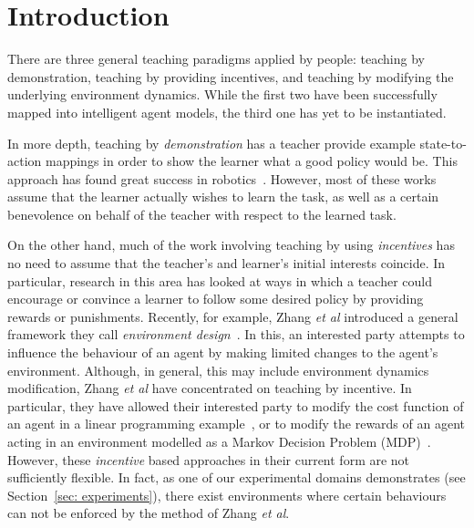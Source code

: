 \section{Introduction}
\noindent There are three general teaching paradigms applied by people:
teaching by demonstration, teaching by providing incentives, and
teaching by modifying the underlying environment dynamics.  While the
first two have been successfully mapped into intelligent agent models,
the third one has yet to be
instantiated.

In more depth, teaching by {\em demonstration} has a teacher provide example
state-to-action mappings in order to show the learner what a good
policy would be.  This approach has found great success in
robotics~\cite{argal_etal_2009}. However, most of these works assume
that the learner actually wishes to learn the task, as well as a
certain benevolence on behalf of the teacher with respect to the
learned task.

On the other hand, much of the work involving teaching by using {\em
  incentives} has no need to assume that the teacher's and learner's
initial interests coincide.  In particular, research in this area has
looked at ways in which a teacher could encourage or convince a
learner to follow some desired policy by providing rewards or
punishments.  Recently, for example, Zhang \emph{et al} introduced a general
framework they call \emph{environment
  design}~\cite{Zhang09:General}. In this,
an interested
party attempts to influence the behaviour of an agent by making
limited changes to the agent's environment. Although, in general, this
may include environment dynamics modification, Zhang \emph{et al} have
concentrated on teaching by incentive. In particular, they 
have allowed their interested party to modify the cost function
of an agent in a linear programming example~\cite{Zhang09:General}, or
to modify the rewards of an agent acting in an environment modelled as
a Markov Decision Problem
(MDP)~\cite{zhang_parkes_2008,Zhang09:Policy}. However, these {\em
  incentive} based approaches in their current form are not
sufficiently flexible. In fact, as one of our experimental domains
demonstrates (see Section~\ref{sec: experiments}), there exist
environments where certain behaviours can not be enforced by the
method of Zhang \emph{et al}.

